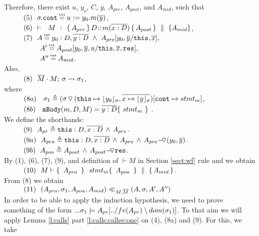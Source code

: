 \begin{description}
 Therefore, there exist $u$, $y_o$, $C$, $\overline y$,  $A_{pre}$, $A_{post}$, and $A_{mid}$, such that \\
 $\SPS (5) \ \ \sigma.\prg{cont}\txteq u:=y_0.m(\overline y)$,\\
$\SPS (6) \  \ \promises  M {\mprepostN {A_{pre}}{D}{m}{x}{D}{A_{post}} {A_{mid}}}$, \\
$\SPS (7) \  \ A \txteq y_0:D ,\overline {y:D}\ \wedge \  A_{pre}[y_0,\overline y/\prg{this},\overline x],$\\
$\SPSF  A'  \txteq A_{post}[y_0,\overline y, u/\prg{this},\overline x, \prg{res}],$\\ 
$\SPSF  A'' \txteq  A_{mid}$. 
\\
Also, \\
$\SPS (8) \ \ \leadstoBounded  {\Mtwo\cdot M}  {\sigma}  {\sigma_1}$, \\
 where \\
$\SPS (8a) \ \ \ \sigma_1\triangleq (\PushSLong { (\prg{this}\mapsto {\interpret{\sigma} {y_0}},{\overline{x \mapsto {\interpret{\sigma} {y}}}})}\sigma [\prg{cont}\mapsto stmt_m]$, \\ 
$\SPS (8b) \ \ \   \prg{mBody}(m,D,M)=\overline{y:D}\{\    stmt_m\ \}$ .\\
We define the shorthands:\\
$\SPS (9) \ \  \Apr \triangleq  \prg{this}:D,\overline{x:D}\, \wedge\, A_{pre}$.
\\
$\SPS (9a) \ \  \Apra \triangleq  \prg{this}:D,\overline{x:D}\, \wedge\, A_{pre}\, \wedge\, {\PushASLong  {(y_0,\overline {y})}  {A_{pre}} } $.
\\
$\SPS (9b) \ \  \Apoa \triangleq  A_{post}\, \wedge\, {\PushASLong {\prg{res}}  {A_{post}}} $.
\\
By (1), (6), (7), (9),  and definition of $\vdash M$ in Section \ref{sect:wf}  rule {} and we obtain\\
$\SPS (10) \ \  M \vdash  \quadruple { \ \Apra \  } {\ stmt_m } {\ \Apoa\ } {A_{mid}}$.\\
From (8) we obtain\\  
$\SPS (11) \ \ (\Apra,\sigma_1,\Apoa, A_{mid}) \ll_{M,\Mtwo} (A,\sigma,A', A'')$
\\
In order to be able to apply the induction hypothesis, we need to prove something of the form $... \sigma_1 \models \Apr[../fv(\Apr)\setminus dom(\sigma_1)]$. To that aim we will apply Lemma   \ref{l:calls} part \ref{l:calls:callee:one} on (4), (8a) and (9). For this, we take

\end{description}
